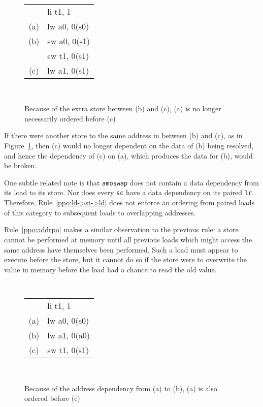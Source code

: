 \begin{figure}[h!]
  \centering
  {
    \tt\small
    \begin{tabular}{cl}
          & li t1, 1       \\
      (a) & lw a0, 0(s0)   \\
      (b) & sw a0, 0(s1)   \\
          & sw t1, 0(s1)   \\
      (c) & lw a1, 0(s1)   \\
    \end{tabular}
  }
  ~~~~
  \diagram
  \caption{Because of the extra store between (b) and (c), (a) is no longer necessarily ordered before (c)}
  \label{fig:litmus:addrdatarfi_no}
\end{figure}

If there were another store to the same address in between (b) and (c), as in Figure~\ref{fig:litmus:addrdatarfi_no}, then (c) would no longer dependent on the data of (b) being resolved, and hence the dependency of (c) on (a), which produces the data for (b), would be broken.

One subtle related note is that {\tt amoswap} does not contain a data dependency from its load to its store.  Nor does every {\tt sc} have a data dependency on its paired {\tt lr}.
Therefore, Rule~\ref{ppo:ld->st->ld} does not enforce an ordering from paired loads of this category to subsequent loads to overlapping addresses.

Rule~\ref{ppo:addrpo} makes a similar observation to the previous rule: a store cannot be performed at memory until all previous loads which might access the same address have themselves been performed.
Such a load must appear to execute before the store, but it cannot do so if the store were to overwrite the value in memory before the load had a chance to read the old value.

\begin{figure}[h!]
  \centering
  {
    \tt\small
    \begin{tabular}{cl}
        & li t1, 1       \\
    (a) & lw a0, 0(s0)   \\
    (b) & lw a1, 0(a0)   \\
    (c) & sw t1, 0(s1)   \\
    \end{tabular}
  }
  ~~~~
  \diagram
  \caption{Because of the address dependency from (a) to (b), (a) is also ordered before (c)}
  \label{fig:litmus:addrpo}
\end{figure}

